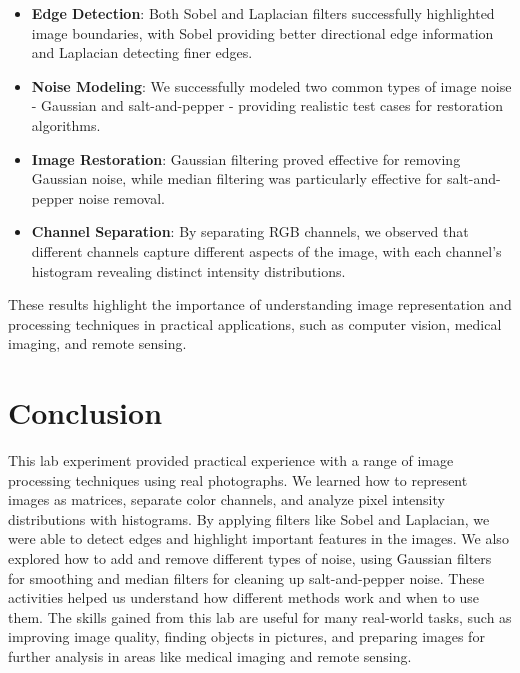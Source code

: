 \documentclass[a4paper, journal]{IEEEtran}
\begin{document}
\begin{itemize}
  \item \textbf{Edge Detection}: Both Sobel and Laplacian filters successfully highlighted image boundaries, with Sobel providing better directional edge information and Laplacian detecting finer edges.
        
  \item \textbf{Noise Modeling}: We successfully modeled two common types of image noise - Gaussian and salt-and-pepper - providing realistic test cases for restoration algorithms.
        
  \item \textbf{Image Restoration}: Gaussian filtering proved effective for removing Gaussian noise, while median filtering was particularly effective for salt-and-pepper noise removal.
        
  \item \textbf{Channel Separation}: By separating RGB channels, we observed that different channels capture different aspects of the image, with each channel's histogram revealing distinct intensity distributions.
\end{itemize}
These results highlight the importance of understanding image representation and processing techniques in practical applications, such as computer vision, medical imaging, and remote sensing.

\section{Conclusion}
This lab experiment provided practical experience with a range of image processing techniques using real photographs. We learned how to represent images as matrices, separate color channels, and analyze pixel intensity distributions with histograms. By applying filters like Sobel and Laplacian, we were able to detect edges and highlight important features in the images. We also explored how to add and remove different types of noise, using Gaussian filters for smoothing and median filters for cleaning up salt-and-pepper noise. These activities helped us understand how different methods work and when to use them. The skills gained from this lab are useful for many real-world tasks, such as improving image quality, finding objects in pictures, and preparing images for further analysis in areas like medical imaging and remote sensing.



\end{document}
